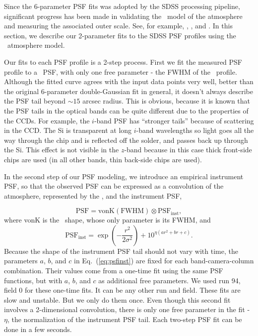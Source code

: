 

Since the 6-parameter PSF fits was adopted by the SDSS processing
pipeline, significant progress has been made in validating the 
\vk~model of the atmosphere and measuring the associated outer
scale. See, for example, \cite{Tokovinin2002},
\cite{Boccas2004}, and \cite{MartinezMessenger}.
In this section, we describe our 2-parameter fits to the SDSS PSF
profiles using the \vk~atmosphere model.

Our fits to each PSF profile is a 2-step process. First we fit the
measured PSF profile to a \vk~PSF, with only one free parameter -
the FWHM of the \vk~profile. Although the fitted
curve agrees with the input data points very well, better than the
original 6-parameter double-Gaussian fit in general, it doesn't always describe
the PSF tail beyond $\sim 15$ arcsec radius. This is obvious, because
it is known that the PSF tails in the optical bands can be quite
different due to the properties of the CCDs.
For example, the $i$-band PSF has ``stronger tails''
because of scattering in the CCD.  The Si is transparent at long $i$-band wavelengths 
so light goes all the way through the chip and is reflected off the solder, and passes 
back up through the Si. This effect is not visible in the $z$-band because in this case
thick front-side chips are used (in all other bands, thin back-side chips are used). 

In the second step of our PSF modeling, we introduce an
empirical instrument PSF, so that the observed PSF can be expressed as
a convolution of the atmosphere, represented by the \vk, and
the instrument PSF,

\begin{equation}
        \textrm{PSF} = \textrm{vonK} (\textrm{FWHM}) \otimes \textrm{PSF}_{\textrm{inst}},
\end{equation} 
where vonK is the \vk~shape, whose only parameter is its FWHM, and
\begin{equation}
        \textrm{PSF}_{\textrm{inst}} = \exp(-\frac{r^2}{2\sigma^2}) + 10^{\eta(ar^2+br+c)}.
\label{eq:psfinst}
\end{equation} 
Because the shape of the instrument PSF tail should not vary with
time, the parameters $a$, $b$, and $c$ in Eq.~(\ref{eq:psfinst}) are
fixed for each band-camera-column combination.
Their values come from a one-time fit using the same PSF functions,
but with $a$, $b$, and $c$ as additional free parameters.
We used run 94, field 0 for these one-time fits. It can be any other
run and field.
These fits are slow and unstable. But we only do them once.
Even though this second fit involves a 2-dimensional convolution,
there is only one free parameter in the fit - 
$\eta$, the normalization of the instrument PSF tail.
Each two-step PSF fit can be done in a few seconds.

